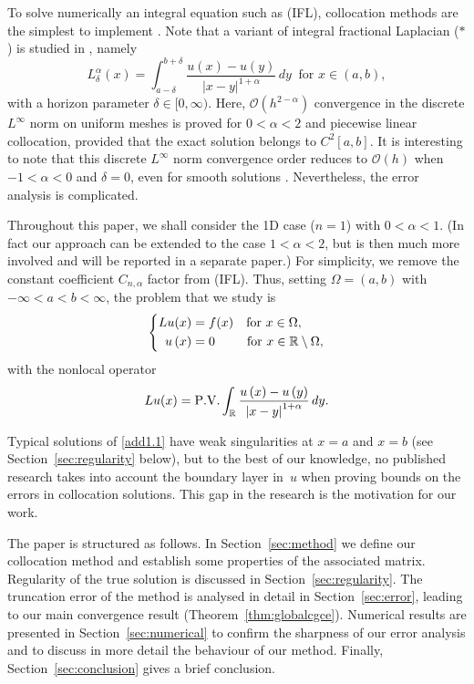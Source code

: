 \documentclass[smallextended]{svjour3}       %
\begin{document}
To solve numerically an integral equation such as (IFL), collocation methods are the simplest to implement \cite{ZhangGJ:16}. 
Note that a variant of integral  fractional Laplacian ($*$)  is studied in \cite{ZhangGJ:16}, namely 
\[L_{\delta}^\alpha(x) = \int_{a-\delta}^{b+\delta}{\frac{u\left( x \right) -u\left( y \right)}{\left| x-y \right|^{1+\alpha}}\,dy}
\ \text{ for }x\in (a,b),\]
with a horizon parameter $\delta\in [0,\infty)$.
Here,  $\mathcal{O}\left( h^{2-\alpha}\right) $  convergence in the discrete $L^\infty$ norm on uniform meshes  is proved
 \cite[Theorem 10]{ZhangGJ:16} for $0<\alpha<2$ and piecewise linear  collocation, provided that the exact solution belongs to $C^2[a,b]$.
It is interesting to note that this discrete $L^\infty$ norm convergence order reduces to $\mathcal{O}\left(h\right)$ 
when $-1<\alpha<0$ and $\delta=0$, even for smooth solutions \cite[Theorem 4.2]{CQSW:2021}.
Nevertheless, the error analysis is complicated. 

Throughout this paper, we shall consider the 1D case ($n=1$) with $0<\alpha<1$.
	(In fact our approach can be extended to the case $1<\alpha<2$, but is then much more involved
	and will be reported  in a separate paper.)
	For simplicity, we remove the constant coefficient $C_{n,\alpha}$ factor from (IFL).
	Thus, setting $\Omega = (a,b)$ with $-\infty < a < b <\infty$, the problem that we study is
	\begin{equation}\label{add1.1}
		\left\{
		\begin{split}
			Lu(x)&=f(x) \quad	{\rm for}~x\in \Omega, \\
			u\left( x \right) &=0 ~~~~\,\quad {\rm for}~x\in \mathbb{R} \setminus\Omega,
		\end{split} \right.
	\end{equation}
with the nonlocal operator
\[
Lu(x) = {\rm P.V.} \int_{\mathbb{R}}{\frac{u\left( x \right) -u\left( y \right)}{\left| x-y \right|^{1+\alpha}}\,dy}.
\]

Typical solutions of \eqref{add1.1} have weak singularities at $x=a$ and $x=b$ (see Section~\ref{sec:regularity} below), but to the best of our knowledge, no published research takes into account the boundary layer in~$u$ when proving bounds on the errors in 
collocation solutions.
This gap in the research is the motivation for our work.

The paper is structured as follows. In Section~\ref{sec:method} we define our collocation method and establish some properties of the associated matrix. Regularity of the true solution is discussed in Section~\ref{sec:regularity}. The truncation error of the method is analysed in detail in Section~\ref{sec:error}, leading to our main convergence result (Theorem~\ref{thm:globalcgce}). Numerical results are presented in Section~\ref{sec:numerical} to confirm the sharpness of our error analysis and to discuss in more detail the behaviour of our method. Finally, Section~\ref{sec:conclusion} gives a brief conclusion.
\end{document}
